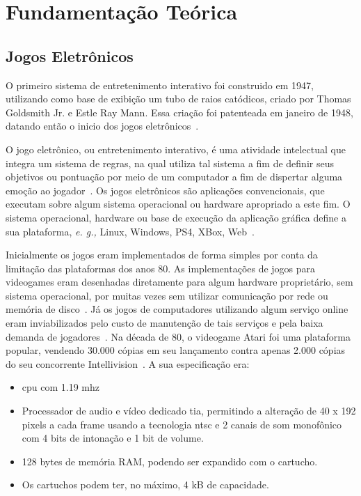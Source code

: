 \chapter{Fundamentação Teórica}
\label{cap2}



\section{Jogos Eletrônicos}



O primeiro sistema de entretenimento interativo foi construido em 1947, utilizando como base de exibição um tubo de raios catódicos, criado por Thomas Goldsmith Jr. e Estle Ray Mann.
%
Essa criação foi patenteada em janeiro de 1948, datando então o inicio dos jogos eletrônicos~\cite{Adams2014Jan, patents1947Jan}.



O jogo eletrônico, ou entretenimento interativo, é uma atividade intelectual que integra um sistema de regras, na qual utiliza tal sistema a fim de definir seus objetivos ou pontuação por meio de um computador a fim de dispertar alguma emoção ao jogador~\cite{video_game_technologies}.
%
Os jogos eletrônicos são aplicações convencionais, que executam sobre algum sistema operacional ou hardware apropriado a este fim.
%
O sistema operacional, hardware ou base de execução da aplicação gráfica define a sua plataforma, \textit{e. g.,} Linux, Windows, PS4, XBox, Web~\cite{adams_1208533}.



Inicialmente os jogos eram implementados de forma simples por conta da limitação das plataformas dos anos 80.
%
As implementações de jogos para videogames eram desenhadas diretamente para algum hardware proprietário, sem sistema operacional, por muitas vezes sem utilizar comunicação por rede ou memória de disco~\cite{adams_1208533}.
%
Já os jogos de computadores utilizando algum serviço online eram inviabilizados pelo custo de manutenção de tais serviços e pela baixa demanda de jogadores~\cite{adams_1208533}.
%
Na década de 80, o videogame Atari foi uma plataforma popular, vendendo 30.000 cópias em seu lançamento contra apenas 2.000 cópias do seu concorrente Intellivision~\cite{atari_age}. A sua especificação era:



\begin{itemize}
  \item \ac{cpu} com 1.19 \ac{mhz}
  \item Processador de audio e vídeo dedicado \ac{tia}, permitindo a alteração de 40 x 192 pixels a cada frame usando a tecnologia \ac{ntsc} e 2 canais de som monofônico com 4 bits de intonação e 1 bit de volume.
  \item 128 bytes de memória \ac{RAM}, podendo ser expandido com o cartucho.
  \item Os cartuchos podem ter, no máximo, 4 kB de capacidade.
\end{itemize}



